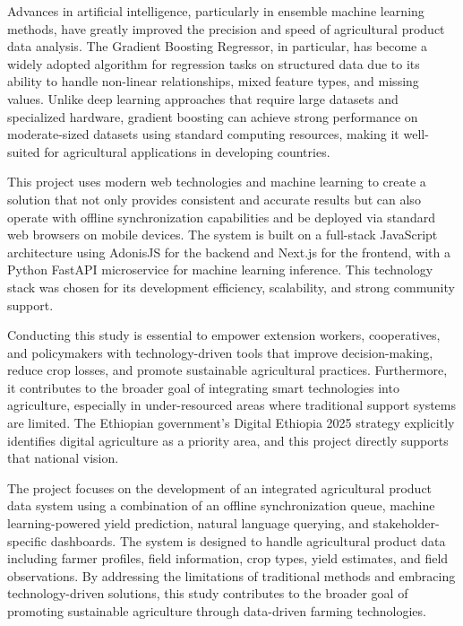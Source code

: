 Advances in artificial intelligence, particularly in ensemble machine learning methods, have greatly improved the precision and speed of agricultural product data analysis. The Gradient Boosting Regressor, in particular, has become a widely adopted algorithm for regression tasks on structured data due to its ability to handle non-linear relationships, mixed feature types, and missing values. Unlike deep learning approaches that require large datasets and specialized hardware, gradient boosting can achieve strong performance on moderate-sized datasets using standard computing resources, making it well-suited for agricultural applications in developing countries.

This project uses modern web technologies and machine learning to create a solution that not only provides consistent and accurate results but can also operate with offline synchronization capabilities and be deployed via standard web browsers on mobile devices. The system is built on a full-stack JavaScript architecture using AdonisJS for the backend and Next.js for the frontend, with a Python FastAPI microservice for machine learning inference. This technology stack was chosen for its development efficiency, scalability, and strong community support.

Conducting this study is essential to empower extension workers, cooperatives, and policymakers with technology-driven tools that improve decision-making, reduce crop losses, and promote sustainable agricultural practices. Furthermore, it contributes to the broader goal of integrating smart technologies into agriculture, especially in under-resourced areas where traditional support systems are limited. The Ethiopian government's Digital Ethiopia 2025 strategy explicitly identifies digital agriculture as a priority area, and this project directly supports that national vision.

The project focuses on the development of an integrated agricultural product data system using a combination of an offline synchronization queue, machine learning-powered yield prediction, natural language querying, and stakeholder-specific dashboards. The system is designed to handle agricultural product data including farmer profiles, field information, crop types, yield estimates, and field observations. By addressing the limitations of traditional methods and embracing technology-driven solutions, this study contributes to the broader goal of promoting sustainable agriculture through data-driven farming technologies.

